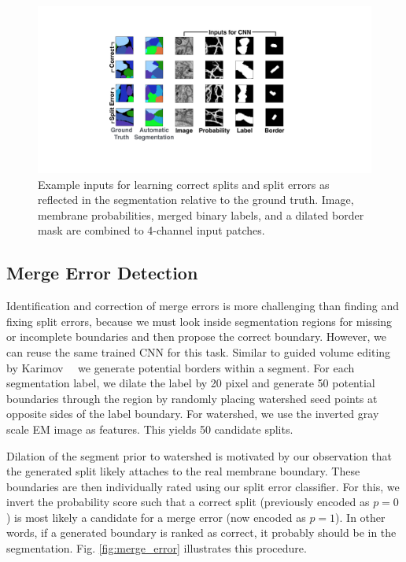 \begin{figure}[h]
\begin{center}
  \includegraphics[width=\linewidth]{gfx/cnn_inputs.pdf}
\end{center}
   \caption{Example inputs for learning correct splits and split errors as reflected in the segmentation relative to the ground truth. Image, membrane probabilities, merged binary labels, and a dilated border mask are combined to 4-channel input patches.}
\label{fig:cnn_inputs}
\end{figure}


\subsection{Merge Error Detection}

Identification and correction of merge errors is more challenging than finding and fixing split errors, because we must look inside segmentation regions for missing or incomplete boundaries and then propose the correct boundary. However, we can reuse the same trained CNN for this task. Similar to guided volume editing by Karimov~\etal~\cite{karimov_guided_volume_editing} we generate potential borders within a segment. For each segmentation label, we dilate the label by 20 pixel and generate 50 potential boundaries through the region by randomly placing watershed seed points at opposite sides of the label boundary. For watershed, we use the inverted gray scale EM image as features. This yields 50 candidate splits. 

Dilation of the segment prior to watershed is motivated by our observation that the generated split likely attaches to the real membrane boundary. These boundaries are then individually rated using our split error classifier. For this, we invert the probability score such that a correct split (previously encoded as $p=0$) is most likely a candidate for a merge error (now encoded as $p=1$). In other words, if a generated boundary is ranked as correct, it probably should be in the segmentation. Fig. \ref{fig:merge_error} illustrates this procedure.

